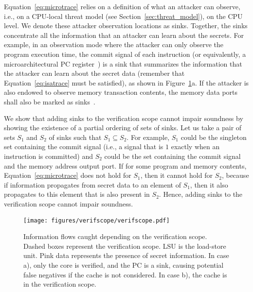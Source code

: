 Equation~\ref{eq:microtrace} relies on a definition of what an attacker can observe, i.e., on a CPU-local threat model (see Section~\ref{sec:threat_model}), on the CPU level.
We denote these attacker observation locations as sinks.
Together, the sinks concentrate all the information that an attacker can learn about the secrets.
For example, in an observation mode where the attacker can only observe the program execution time, the commit signal of each instruction (or equivalently, a microarchitectural PC register~\cite{ceesay2024mucfi}) is a sink that summarizes the information that the attacker can learn about the secret data (remember that Equation~\ref{eq:isatrace} must be satisfied), as shown in Figure~\ref{fig:verifscope}a.
If the attacker is also endowed to observe memory transaction contents, the memory data ports shall also be marked as sinks~\cite{wang2023specification}.

We show that adding sinks to the verification scope cannot impair soundness by showing the existence of a partial ordering of sets of sinks.
Let us take a pair of sets $S_1$ and $S_2$ of sinks such that $S_1 \subseteq S_2$.
For example, $S_1$ could be the singleton set containing the commit signal (i.e., a signal that is $1$ exactly when an instruction is committed) and $S_2$ could be the set containing the commit signal and the memory address output port.
If for some program and memory contents, Equation~\ref{eq:microtrace} does not hold for $S_1$, then it cannot hold for $S_2$, because if information propagates from secret data to an element of $S_1$, then it also propagates to this element that is also present in $S_2$.
Hence, adding sinks to the verification scope cannot impair soundness.

\begin{figure}
    \begin{center}
    \texttt{[image: figures/verifscope/verifscope.pdf]}
    \end{center}
    \vspace*{-1em}
    \caption{Information flows caught depending on the verification scope. Dashed boxes represent the verification scope. LSU is the load-store unit. Pink data represents the presence of secret information. In case a), only the core is verified, and the PC is a sink, causing potential false negatives if the cache is not considered. In case b), the cache is in the verification scope.
    \label{fig:verifscope} }
    \vspace*{-1.4em}
\end{figure}



